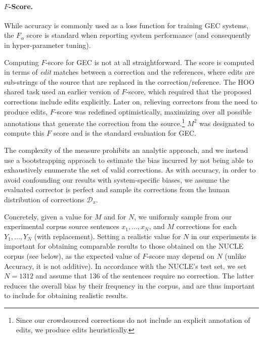 \documentclass[letterpaper, 11pt]{article}
\begin{document}
\paragraph{$F$-Score.}
While accuracy is commonly used as a loss function for training GEC systems,
the $F_\alpha$ score is standard when reporting system performance (and consequently in hyper-parameter
tuning).

Computing $F$-score for GEC is not at all straightforward.
The score is computed in terms of {\it edit} matches between a correction and the references,
where edits are sub-strings of the source that are replaced in the correction/reference.
The HOO shared task used an earlier version of $F$-score, which required that the proposed corrections include edits explicitly.
Later on, relieving correctors from the need to produce edits, $F$-score was redefined optimistically, maximizing
over all possible annotations that generate the correction from the source.\footnote{Since our crowdsourced corrections
	do not include an explicit annotation of edits, we produce edits heuristically.}
$M^2$ \cite{dahlmeier2012better} was designated to compute this $F$ score and is the standard evaluation for GEC.

The complexity of the measure prohibits an analytic approach, and
we instead use a bootstrapping approach to estimate the bias incurred
by not being able to exhaustively enumerate the set of valid corrections.
As with accuracy,
in order to avoid confounding our results with system-specific biases,
we assume the evaluated corrector is perfect and sample its corrections from the human distribution of corrections $\mathcal{D}_x$.

Concretely, given a value for $M$ and for $N$, we uniformly sample from our experimental
corpus source sentences $x_1,...,x_N$, and $M$ corrections for each $Y_1,...,Y_N$ (with replacement).
Setting a realistic value for $N$ in our experiments is important
for obtaining comparable results to those obtained on the NUCLE corpus (see below), 
as the expected value of $F$-score may depend on $N$ (unlike Accuracy, it is not additive).
In accordance with the NUCLE's test set,
we set $N=1312$ and assume that 136 of the sentences require no correction.
The latter reduces the overall bias by their frequency in the corpus,
and are thus important to include for obtaining realistic results.
\end{document}
